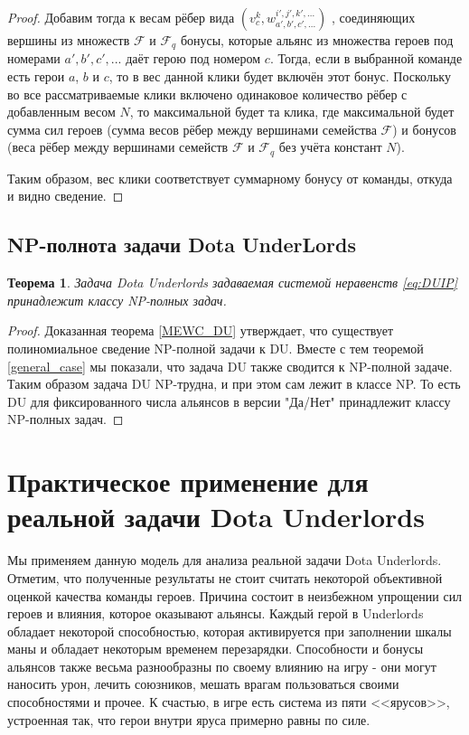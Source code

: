 \documentclass{article}
\newtheorem{theorem}{Теорема}
\begin{document}
\begin{proof}
Добавим тогда к весам рёбер вида  $(v_c^{k}, w_{a',b',c',...}^{i',j',k',...} )$ , соединяющих вершины из множеств 
$\mathcal{F}$ и $\mathcal{F}_q$ бонусы, которые альянс из множества героев под номерами $a', b', c',...$ даёт герою под номером $c$. Тогда, если в выбранной команде есть герои $a$, $b$ и $c$, то в вес данной клики будет включён этот бонус. Поскольку во все рассматриваемые клики включено одинаковое количество рёбер с добавленным весом $N$, то максимальной будет та клика, где максимальной будет сумма сил героев (сумма весов рёбер между вершинами семейства $\mathcal{F}$) и бонусов (веса рёбер между вершинами семейств $\mathcal{F}$ и $\mathcal{F}_q$ без учёта констант $N$).
    
Таким образом, вес клики соответствует суммарному бонусу от команды, откуда и видно сведение.
    
\end{proof}


\subsection{NP-полнота задачи Dota UnderLords}

\begin{theorem}
    Задача Dota Underlords задаваемая системой неравенств \eqref{eq:DUIP} принадлежит классу NP-полных задач.
\end{theorem}

\begin{proof}
	Доказанная теорема \ref{MEWC_DU} утверждает, что существует полиномиальное сведение NP-полной задачи к DU. Вместе с тем теоремой \ref{general_case} мы показали, что задача DU также сводится к NP-полной задаче. 
Таким образом задача DU NP-трудна, и при этом сам лежит в классе NP. То есть DU для фиксированного числа альянсов в версии "Да/Нет" принадлежит классу NP-полных задач. 
\end{proof}

\section{Практическое применение для реальной задачи Dota Underlords}
\label{SectionComputationalResults}
  
Мы применяем данную модель для анализа реальной задачи Dota Underlords. Отметим, что полученные результаты не стоит считать некоторой объективной оценкой качества команды героев. Причина состоит в неизбежном упрощении сил героев и влияния, которое оказывают альянсы. Каждый герой в Underlords обладает некоторой способностью, которая активируется при заполнении шкалы маны и обладает некоторым временем перезарядки. Способности и бонусы альянсов также весьма разнообразны по своему влиянию на игру - они могут наносить урон, лечить союзников, мешать врагам пользоваться своими способностями и прочее. К счастью, в игре есть система из пяти <<ярусов>>, устроенная так, что герои внутри яруса примерно равны по силе.
\end{document}
